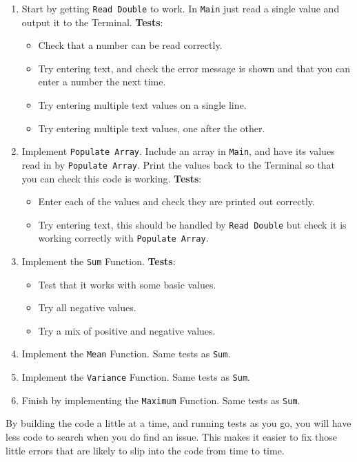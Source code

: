 \begin{enumerate}
  \item Start by getting \texttt{Read Double} to work. In \texttt{Main} just read a single value and output it to the Terminal. \textbf{Tests}:
  \begin{itemize}
    \item Check that a number can be read correctly.
    \item Try entering text, and check the error message is shown and that you can enter a number the next time.
    \item Try entering multiple text values on a single line.
    \item Try entering multiple text values, one after the other.
  \end{itemize}
  \item Implement \texttt{Populate Array}. Include an array in \texttt{Main}, and have its values read in by \texttt{Populate Array}. Print the values back to the Terminal so that you can check this code is working. \textbf{Tests}:
  \begin{itemize}
    \item Enter each of the values and check they are printed out correctly.
    \item Try entering text, this should be handled by \texttt{Read Double} but check it is working correctly with \texttt{Populate Array}.
  \end{itemize}
  \item Implement the \texttt{Sum} Function.
  \textbf{Tests}:
  \begin{itemize}
    \item Test that it works with some basic values.
    \item Try all negative values.
    \item Try a mix of positive and negative values.
  \end{itemize}
  \item Implement the \texttt{Mean} Function. Same tests as \texttt{Sum}.
  \item Implement the \texttt{Variance} Function. Same tests as \texttt{Sum}.
  \item Finish by implementing the \texttt{Maximum} Function. Same tests as \texttt{Sum}.
\end{enumerate}

By building the code a little at a time, and running tests as you go, you will have less code to search when you do find an issue. This makes it easier to fix those little errors that are likely to slip into the code from time to time.


